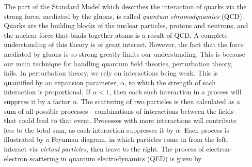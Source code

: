 The part of the Standard Model which describes the interaction of quarks via the strong force, mediated by the gluons, is called \emph{quantum chromodynamics} (QCD).
Quarks are the building blocks of the nuclear particles, protons and neutrons, and the nuclear force that binds together atoms is a result of QCD.
A complete understanding of this theory is of great interest.
However, the fact that the force mediated by gluons is so strong greatly limits our understanding.
This is because our main technique for handling quantum field theories, perturbation theory, fails.
In perturbation theory, we rely on interactions being weak.
This is quantified by an expansion parameter, $\alpha$, to which the strength of each interaction is proportional.
If $\alpha<1$, then each such interaction in a process will suppress it by a factor $\alpha$.
The scattering of two particles is then calculated as a sum of all possible processes---combinations of interactions between the fields---that could lead to that event.
Processes with more interactions will contribute less to the total sum, as each interaction suppresses it by $\alpha$.
Each process is illustrated by a Feynman diagram, in which particles come in from the left, interact via \emph{virtual particles}, then leave to the right.
The process of electron-electron scattering in quantum electrodynamics (QED) is given by
%

